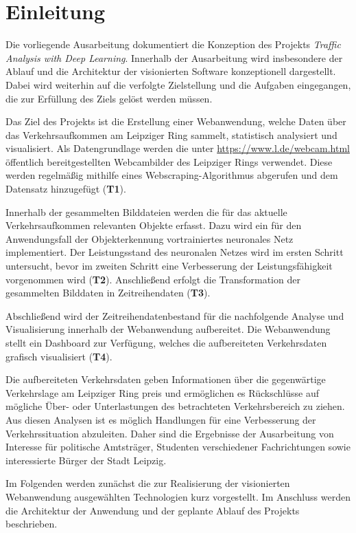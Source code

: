 \newpage
\section{Einleitung}

Die vorliegende Ausarbeitung dokumentiert die Konzeption des Projekts \textit{Traffic Analysis with Deep Learning}.
Innerhalb der Ausarbeitung wird insbesondere der Ablauf und die Architektur der visionierten Software konzeptionell 
dargestellt.
Dabei wird weiterhin auf die verfolgte Zielstellung und die Aufgaben eingegangen, die zur Erfüllung des Ziels
gelöst werden müssen.    

Das Ziel des Projekts ist die Erstellung einer Webanwendung, welche Daten über das 
Verkehrsaufkommen am Leipziger Ring sammelt, statistisch analysiert und visualisiert.
Als Datengrundlage werden die unter \url{https://www.l.de/webcam.html} öffentlich bereitgestellten Webcambilder
des Leipziger Rings verwendet. 
Diese werden regelmäßig mithilfe eines Webscraping-Algorithmus abgerufen und dem Datensatz hinzugefügt (\textbf{T1}). 

Innerhalb der gesammelten Bilddateien werden die für das aktuelle Verkehrsaufkommen relevanten Objekte erfasst.
Dazu wird ein für den Anwendungsfall der Objekterkennung vortrainiertes neuronales Netz implementiert.
Der Leistungsstand des neuronalen Netzes wird im ersten Schritt untersucht, bevor im zweiten Schritt eine
Verbesserung der Leistungsfähigkeit vorgenommen wird (\textbf{T2}). 
Anschließend erfolgt die Transformation der gesammelten Bilddaten in Zeitreihendaten (\textbf{T3}). 

Abschließend wird der Zeitreihendatenbestand für die nachfolgende Analyse und Visualisierung innerhalb der 
Webanwendung aufbereitet. 
Die Webanwendung stellt ein Dashboard zur Verfügung, welches die aufbereiteten Verkehrsdaten grafisch 
visualisiert (\textbf{T4}). 

Die aufbereiteten Verkehrsdaten geben Informationen über die gegenwärtige Verkehrslage am Leipziger Ring preis 
und ermöglichen es Rückschlüsse auf mögliche Über- oder Unterlastungen des betrachteten Verkehrsbereich zu ziehen.
Aus diesen Analysen ist es möglich Handlungen für eine Verbesserung der Verkehrssituation abzuleiten.  
Daher sind die Ergebnisse der Ausarbeitung von Interesse für politische Amtsträger, Studenten verschiedener 
Fachrichtungen sowie interessierte Bürger der Stadt Leipzig.

Im Folgenden werden zunächst die zur Realisierung der visionierten Webanwendung ausgewählten Technologien kurz
vorgestellt.
Im Anschluss werden die Architektur der Anwendung und der geplante Ablauf des Projekts beschrieben.   

\newpage